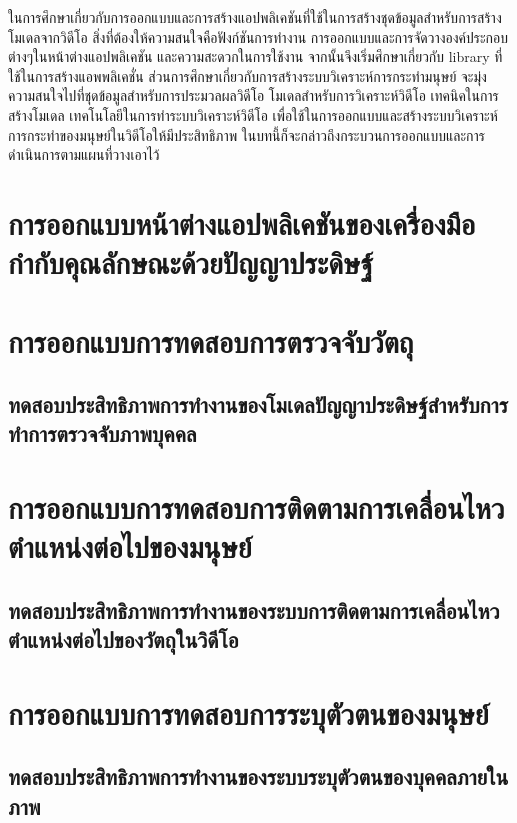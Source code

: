 ในการศึกษาเกี่ยวกับการออกแบบและการสร้างแอปพลิเคชันที่ใช้ในการสร้างชุดข้อมูลสำหรับการสร้างโมเดลจากวิดีโอ 
สิ่งที่ต้องให้ความสนใจคือฟังก์ชันการทำงาน การออกแบบและการจัดวางองค์ประกอบต่างๆในหน้าต่างแอปพลิเคชัน
และความสะดวกในการใช้งาน จากนั้นจึงเริ่มศึกษาเกี่ยวกับ library ที่ใช้ในการสร้างแอพพลิเคชั่น
ส่วนการศึกษาเกี่ยวกับการสร้างระบบวิเคราะห์การกระทำมนุษย์ จะมุ่งความสนใจไปที่ชุดข้อมูลสำหรับการประมวลผลวิดีโอ
โมเดลสำหรับการวิเคราะห์วิดีโอ เทคนิคในการสร้างโมเดล เทคโนโลยีในการทำระบบวิเคราะห์วิดีโอ
เพื่อใช้ในการออกแบบและสร้างระบบวิเคราะห์การกระทำของมนุษย์ในวิดีโอให้มีประสิทธิภาพ
ในบทนี้ก็จะกล่าวถึงกระบวนการออกแบบและการดำเนินการตามแผนที่วางเอาไว้
\section{การออกแบบหน้าต่างแอปพลิเคชันของเครื่องมือกำกับคุณลักษณะด้วยปัญญาประดิษฐ์}

\clearpage

\section{การออกแบบการทดสอบการตรวจจับวัตถุ}
\subsection{ทดสอบประสิทธิภาพการทำงานของโมเดลปัญญาประดิษฐ์สำหรับการทำการตรวจจับภาพบุคคล}

\clearpage

\section{การออกแบบการทดสอบการติดตามการเคลื่อนไหวตำแหน่งต่อไปของมนุษย์}
\subsection{ทดสอบประสิทธิภาพการทำงานของระบบการติดตามการเคลื่อนไหวตำแหน่งต่อไปของวัตถุในวิดีโอ}

\clearpage

\section{การออกแบบการทดสอบการระบุตัวตนของมนุษย์}
\subsection{ทดสอบประสิทธิภาพการทำงานของระบบระบุตัวตนของบุคคลภายในภาพ}

\clearpage

